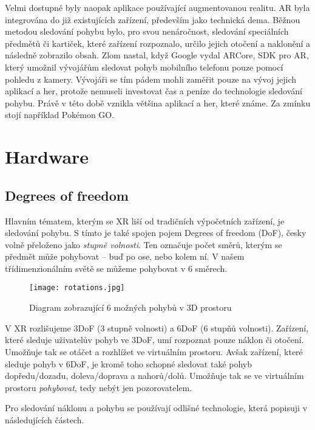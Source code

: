 Velmi dostupné byly naopak aplikace používající augmentovanou realitu. AR byla integrována do již existujících zařízení, především jako technická dema. Běžnou metodou sledování pohybu bylo, pro svou nenáročnost, sledování speciálních předmětů či kartiček, které zařízení rozpoznalo, určilo jejich otočení a naklonění a následně zobrazilo obsah. Zlom nastal, když Google vydal ARCore, \gls{SDK} pro AR, který umožnil vývojářům sledovat pohyb mobilního telefonu pouze pomocí pohledu z kamery. Vývojáři se tím pádem mohli zaměřit pouze na vývoj jejich aplikací a her, protože nemuseli investovat čas a peníze do technologie sledování pohybu. Právě v této době vznikla většina aplikací a her, které známe. Za zmínku stojí například Pokémon GO. \cite{enwiki:1182789097}

\chapter{Hardware}

\section{Degrees of freedom}

Hlavním tématem, kterým se XR liší od tradičních výpočetních zařízení, je sledování pohybu. S tímto je také spojen pojem Degrees of freedom (DoF), česky volně přeloženo jako \textit{stupně volnosti}. Ten označuje počet směrů, kterým se předmět může pohybovat -- buď po ose, nebo kolem ní. V našem třídimenzionálním světě se můžeme pohybovat v 6 směrech. \cite{mechatech_3dof_6dof}

\begin{figure}[H]
    \centering
    \texttt{[image: rotations.jpg]}
    \caption{Diagram zobrazující 6 možných pohybů v 3D prostoru \cite{nasa_aircraft}}
    \label{rotations_nasa_fig}
\end{figure}

V XR rozlišujeme 3DoF (3 stupně volnosti) a 6DoF (6 stupňů volnosti). Zařízení, které sleduje uživatelův pohyb ve 3DoF, umí rozpoznat pouze náklon či otočení. Umožňuje tak se otáčet a rozhlížet ve virtuálním prostoru. Avšak zařízení, které sleduje pohyb v 6DoF, je kromě toho schopné sledovat také pohyb dopředu/dozadu, doleva/doprava a nahorů/dolů. Umožňuje tak se ve virtuálním prostoru \textit{pohybovat}, tedy nebýt jen pozorovatelem. \cite{mechatech_3dof_6dof}

Pro sledování náklonu a pohybu se používají odlišné technologie, která popisuji v následujících částech.

